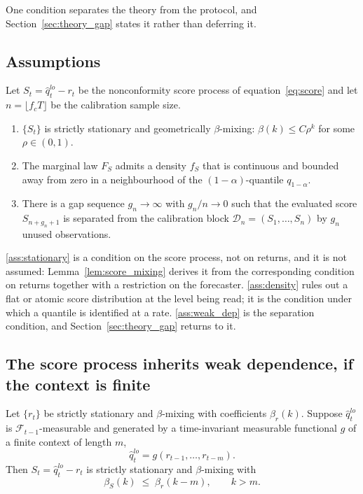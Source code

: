 One condition separates the theory from the protocol, and
Section~\ref{sec:theory_gap} states it rather than deferring it.

\subsection{Assumptions}
\label{sec:theory_assumptions}

\begin{assumption}
	\label{ass:main}
	Let $S_t = \hat q_t^{lo} - r_t$ be the nonconformity score process of
	equation~\eqref{eq:score} and let $n = \lfloor f_c T\rfloor$ be the
	calibration sample size.
	\begin{enumerate}[label=\textup{(A\arabic*)},leftmargin=2.6em]
		\item\label{ass:stationary} $\{S_t\}$ is strictly stationary and
		geometrically $\beta$-mixing: $\beta(k)\le C\rho^{k}$ for some
		$\rho\in(0,1)$.
		\item\label{ass:density} The marginal law $F_S$ admits a density $f_S$
		that is continuous and bounded away from zero in a neighbourhood of the
		$(1-\alpha)$-quantile $q_{1-\alpha}$.
		\item\label{ass:weak_dep} There is a gap sequence $g_n\to\infty$ with
		$g_n/n\to 0$ such that the evaluated score $S_{n+g_n+1}$ is separated
		from the calibration block $\mathcal D_n = (S_1,\dots,S_n)$ by $g_n$
		unused observations.
	\end{enumerate}
\end{assumption}

\ref{ass:stationary} is a condition on the score process, not on returns, and it
is not assumed: Lemma~\ref{lem:score_mixing} derives it from the corresponding
condition on returns together with a restriction on the forecaster.
\ref{ass:density} rules out a flat or atomic score distribution at the level
being read; it is the condition under which a quantile is identified at a rate.
\ref{ass:weak_dep} is the separation condition, and Section~\ref{sec:theory_gap}
returns to it.

\subsection{The score process inherits weak dependence, if the context is finite}
\label{sec:theory_lemmas}

\begin{lemma}
	\label{lem:score_mixing}
	Let $\{r_t\}$ be strictly stationary and $\beta$-mixing with coefficients
	$\beta_r(k)$. Suppose $\hat q_t^{lo}$ is $\mathcal F_{t-1}$-measurable and
	generated by a time-invariant measurable functional $g$ of a finite context
	of length $m$,
	\begin{equation}
		\label{eq:forecast_functional}
		\hat q_t^{lo} = g(r_{t-1},\dots,r_{t-m}).
	\end{equation}
	Then $S_t = \hat q_t^{lo} - r_t$ is strictly stationary and $\beta$-mixing
	with
	\begin{equation}
		\label{eq:score_mixing_bound}
		\beta_S(k)\;\le\;\beta_r(k-m),\qquad k>m.
	\end{equation}
\end{lemma}

